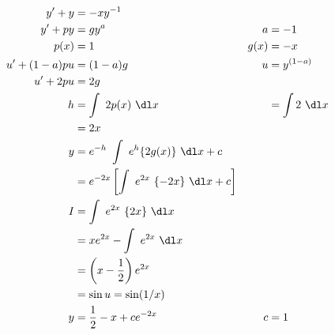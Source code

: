 \begin{enumerate}
          \begin{align}
              y' + y       & = -xy^{-1}                                                                         \\
              y' +py       & = gy^{a}                                                  & a    & = -1            \\
              p(x)         & = 1                                                       & g(x) & = -x            \\
              u' + (1-a)pu & = (1-a)g                                                  & u    & = y^{(1-a)}     \\
              u' + 2pu     & = 2g                                                                               \\
              h            & = \int\ 2p(x)\ \dl x                                      &      & = \int 2\ \dl x \\
                           & = 2x                                                                               \\
              y            & = e^{-h}\ \int\ e^{h}\{2g(x)\}\ \dl x + c                                          \\
                           & = e^{-2x} \left[ \int\ e^{2x}\ \{-2x\}\ \dl x + c \right]                          \\
              I            & =\int\ e^{2x}\ \{2x\}\ \dl x                                                       \\
                           & = xe^{2x} - \int\ e^{2x}\ \dl x                                                    \\
                           & = \left( x - \frac{1}{2} \right)e^{2x}                                             \\
                           & = \sin u = \sin(1/x)                                                               \\
              y            & = \frac{1}{2} - x + ce^{-2x}                              & c    & = 1
          \end{align}


\end{enumerate}
